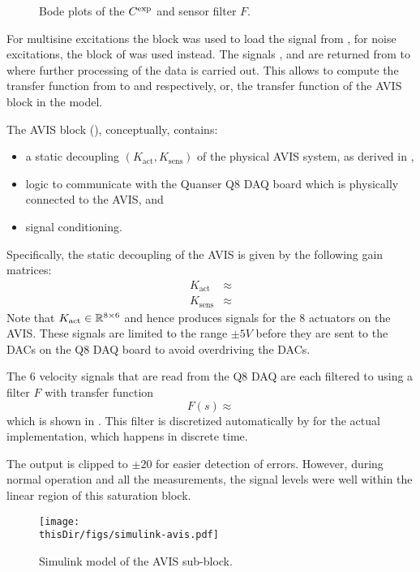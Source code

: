 \begin{figure}
\caption{Bode plots of the $C^{\mathrm{exp}}$ and sensor filter $F$.}
\label{fig:avis:bodeplots:controllerAndSensor}
\end{figure}

For multisine excitations the  block was used to load the  signal from \MATLAB, for noise excitations, the  block of \Simulink was used instead.
The signals ,  and  are returned from \Simulink to \MATLAB where further processing of the data is carried out.
This allows to compute the transfer function from  to  and  respectively, or, the transfer function of the \gls{AVIS} block in the \Simulink model.

The \gls{AVIS} block (), conceptually, contains:
\begin{itemize}
  \item a static decoupling $(K_{\mathrm{act}}, K_{\mathrm{sens}})$ of the physical \gls{AVIS} system, as derived in \citep{Rademakers2005MSc},
  \item logic to communicate with the Quanser Q8 \gls{DAQ} board which is physically connected to the \gls{AVIS}, and
  \item signal conditioning.
\end{itemize}

Specifically, the static decoupling of the \gls{AVIS} is given by the following gain matrices: 
\begin{align}
  K_{\mathrm{act}}    &\approx \\
  K_{\mathrm{sens}} &\approx
\end{align}
Note that $K_{\mathrm{act}} \in \mathbb{R}^{8\times6}$ and hence produces signals for the $8$ actuators on the \gls{AVIS}.
These signals are limited to the range $\pm 5\unit{V}$ before they are sent to the \glspl{DAC} on the Q8 \gls{DAQ} board to avoid overdriving the \glspl{DAC}.

The $6$ velocity signals that are read from the Q8 \gls{DAQ} are each filtered to  using a filter  $F$ with transfer function
\begin{equation}
  F(s) \approx 
\end{equation}
which is shown in .
This filter is discretized automatically by \Simulink for the actual implementation, which happens in discrete time.

The output  is clipped to $\pm 20$ for easier detection of errors.
However, during normal operation and all the measurements, the signal levels were well within the linear region of this saturation block.

\begin{figure}
\setlength\figurewidth{\columnwidth}
  \texttt{[image: \\thisDir/figs/simulink-avis.pdf]}
  \caption{Simulink model of the AVIS sub-block.}
  \label{fig:avis:simulink:avis}
\end{figure}

